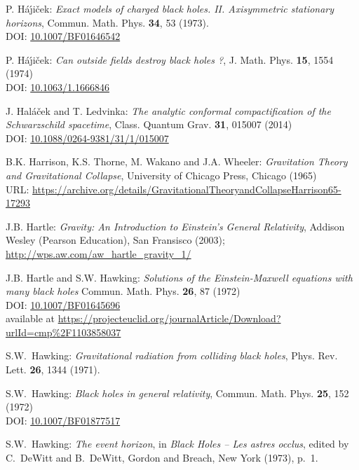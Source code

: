 \begin{thebibliography}{123}
P. H\'a\'\j i\v{c}ek: {\em Exact models of charged black holes.
II. Axisymmetric stationary horizons},
Commun. Math. Phys. {\bf 34}, 53 (1973). \\
DOI: \href{https://doi.org/10.1007/BF01646542}{10.1007/BF01646542}

P. H\'a\'\j i\v{c}ek: {\em Can outside fields destroy black holes ?},
J. Math. Phys. {\bf 15}, 1554 (1974)\\
DOI: \href{https://doi.org/10.1063/1.1666846}{10.1063/1.1666846}

J. Hal\'a\v{c}ek and T. Ledvinka:
{\em The analytic conformal compactification of the Schwarzschild spacetime},
Class. Quantum Grav. {\bf 31}, 015007 (2014)\\
DOI: \href{https://doi.org/10.1088/0264-9381/31/1/015007}{10.1088/0264-9381/31/1/015007}

B.K. Harrison, K.S. Thorne, M. Wakano and J.A. Wheeler:
{\em Gravitation Theory and Gravitational Collapse},
University of Chicago Press, Chicago (1965)\\
URL: {\footnotesize\url{https://archive.org/details/GravitationalTheoryandCollapseHarrison65-17293}}

J.B. Hartle: \emph{Gravity: An Introduction to Einstein's General Relativity},
Addison Wesley (Pearson Education), San Fransisco (2003); \\
\url{http://wps.aw.com/aw_hartle_gravity_1/}

J.B. Hartle and S.W. Hawking:
{\em Solutions of the Einstein-Maxwell equations with many black holes}
Commun. Math. Phys. {\bf 26}, 87 (1972)\\
DOI: \href{https://doi.org/10.1007/BF01645696}{10.1007/BF01645696}\\
available at \url{https://projecteuclid.org/journalArticle/Download?urlId=cmp%2F1103858037}

S.W.~Hawking: {\em Gravitational radiation from colliding black holes},
Phys. Rev. Lett. {\bf 26}, 1344 (1971).

S.W.~Hawking: {\em Black holes in general relativity},
Commun. Math. Phys. {\bf 25}, 152 (1972)\\
DOI: \href{https://doi.org/10.1007/BF01877517}{10.1007/BF01877517}

S.W.~Hawking: {\em The event horizon},
in {\em Black Holes -- Les astres occlus}, edited by C.~DeWitt and B.~DeWitt,
Gordon and Breach, New York (1973), p.~1.


\end{thebibliography}
